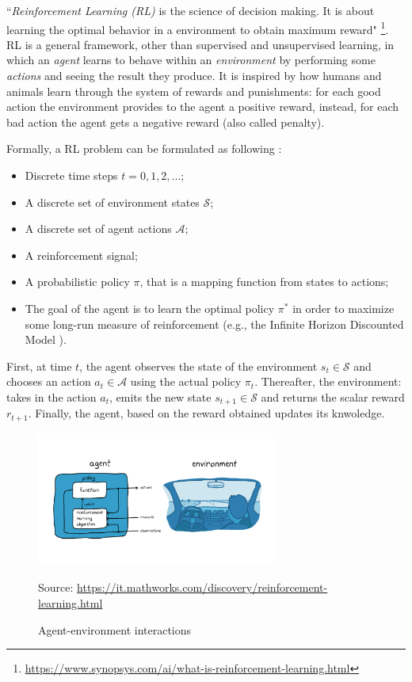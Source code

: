 \documentclass[12pt,a4paper,openright,twoside]{book}
\newcommand{\fonte}[1]{{\color{gray} \small \hypersetup{citecolor=gray} Source: #1}}
\begin{document}
``\emph{Reinforcement Learning (RL)} is the science of decision making. It is about learning the optimal behavior 
    in a environment to obtain maximum reward" 
    \footnote{\url{https://www.synopsys.com/ai/what-is-reinforcement-learning.html}}.
    RL is a general framework, other than supervised and unsupervised learning, in which an \emph{agent} learns 
    to behave within an \emph{environment} by performing some \emph{actions} and seeing the result they produce.
    It is inspired by how humans and animals learn through the system of rewards and punishments: for each good action
    the environment provides to the agent a positive reward, instead, for each bad action the agent gets a negative 
    reward (also called penalty).

Formally, a RL problem can be formulated as following \cite{RLSurvey}:
    \begin{itemize}
        \item Discrete time steps $t=0, 1, 2, ...$;
        \item A discrete set of environment states $\mathcal{S}$;
        \item A discrete set of agent actions $\mathcal{A}$;
        \item A reinforcement signal;
        \item A probabilistic policy $\pi$, that is a mapping function from states to actions;
        \item The goal of the agent is to learn the optimal policy $\pi^*$ in order to maximize 
                some long-run measure of reinforcement (e.g., the Infinite Horizon Discounted Model \cite{RLSurvey}).
    \end{itemize}
    First, at time $t$, the agent observes the state of the environment $s_t \in \mathcal{S}$
        and chooses an action $a_t \in \mathcal{A}$ using the actual policy $\pi_t$. 
        Thereafter, the environment: takes in the action $a_t$, emits the new state $s_{t+1} \in \mathcal{S}$ 
        and returns the scalar reward $r_{t+1}$.
        Finally, the agent, based on the reward obtained updates its knwoledge.

\begin{figure}[t]
    \centering
    \includegraphics[width=0.7\textwidth]{figures/rl.png}
    \caption{Agent-environment interactions}
    \fonte{\url{https://it.mathworks.com/discovery/reinforcement-learning.html}}
    \label{fig:rl_schema}
\end{figure}
\end{document}
